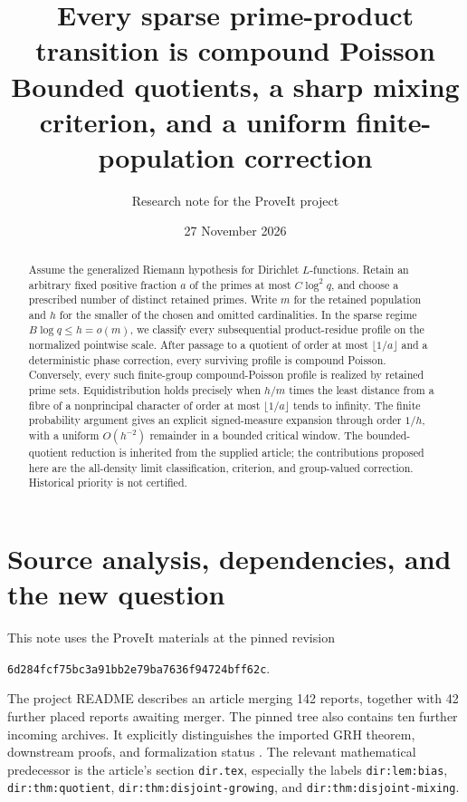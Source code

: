 \documentclass[11pt]{article}
\title{Every sparse prime-product transition is compound Poisson\\[4pt]\large Bounded quotients, a sharp mixing criterion, and a uniform finite-population correction}
\author{Research note for the ProveIt project}
\date{27 November 2026}
\theoremstyle{remark}\newtheorem{remark}[theorem]{Remark}
\begin{document}
\maketitle
\begin{abstract}
Assume the generalized Riemann hypothesis for Dirichlet $L$-functions. Retain an arbitrary fixed positive fraction $a$ of the primes at most $C\log^2q$, and choose a prescribed number of distinct retained primes. Write $m$ for the retained population and $h$ for the smaller of the chosen and omitted cardinalities. In the sparse regime $B\log q\le h=o(m)$, we classify every subsequential product-residue profile on the normalized pointwise scale. After passage to a quotient of order at most $\lfloor1/a\rfloor$ and a deterministic phase correction, every surviving profile is compound Poisson. Conversely, every such finite-group compound-Poisson profile is realized by retained prime sets. Equidistribution holds precisely when $h/m$ times the least distance from a fibre of a nonprincipal character of order at most $\lfloor1/a\rfloor$ tends to infinity. The finite probability argument gives an explicit signed-measure expansion through order $1/h$, with a uniform $O(h^{-2})$ remainder in a bounded critical window. The bounded-quotient reduction is inherited from the supplied article; the contributions proposed here are the all-density limit classification, criterion, and group-valued correction. Historical priority is not certified.
\end{abstract}

\section{Source analysis, dependencies, and the new question}

This note uses the ProveIt materials at the pinned revision
\begin{center}\small\texttt{6d284fcf75bc3a91bb2e79ba7636f94724bff62c}.\end{center}
The project README describes an article merging 142 reports, together with 42 further placed reports awaiting merger. The pinned tree also contains ten further incoming archives. It explicitly distinguishes the imported GRH theorem, downstream proofs, and formalization status \cite{repo,article}. The relevant mathematical predecessor is the article's section \texttt{dir.tex}, especially the labels
\texttt{dir:lem:bias}, \texttt{dir:thm:quotient},
\texttt{dir:thm:disjoint-growing}, and
\texttt{dir:thm:disjoint-mixing}.
\end{document}
